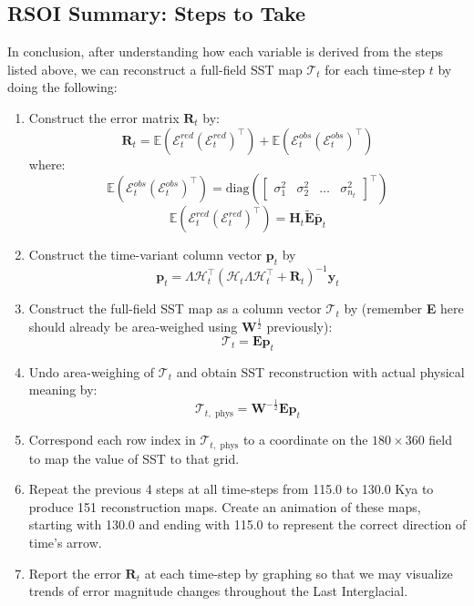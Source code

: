 \documentclass{article}
\begin{document}
\subsection{RSOI Summary: Steps to Take}
In conclusion, after understanding how each variable is derived from the steps listed above, we can reconstruct a full-field SST map $\mathcal{T}_t$ for each time-step $t$ by doing the following:
\begin{enumerate}
    \item Construct the error matrix $\textbf{R}_t$ by:
    $$\textbf{R}_t = \mathbb{E}(\mathcal{E}_t^{red} (\mathcal{E}_t^{red})^\intercal) + \mathbb{E}(\mathcal{E}_t^{obs} (\mathcal{E}_t^{obs})^\intercal)$$
    where:
    $$\mathbb{E}(\mathcal{E}_t^{obs} (\mathcal{E}_t^{obs})^\intercal) = 
    \text{diag}({\begin{bmatrix}
        \sigma^2_1 & \sigma^2_2 & \dots & \sigma^2_{n_t}
    \end{bmatrix}}^\intercal)$$
    $$ \mathbb{E}(\mathcal{E}_t^{red} (\mathcal{E}_t^{red})^\intercal) = 
    \textbf{H}_t \tilde{\textbf{E}} \tilde{\textbf{p}_t}$$

    \item Construct the time-variant column vector $\textbf{p}_t$ by
    $${\textbf{p}_t} = {\Lambda \mathcal{H}_t^\intercal} ({\mathcal{H}_t \Lambda \mathcal{H}_t^\intercal} + {\textbf{R}_t})^{-1} {\textbf{y}_t}$$

    \item Construct the full-field SST map as a column vector $\mathcal{T}_t$ by (remember \textbf{E} here should already be area-weighed using $\textbf{W}^{\frac{1}{2}}$ previously):
    $$\mathcal{T}_t = \textbf{E} \textbf{p}_t$$

    \item Undo area-weighing of $\mathcal{T}_t$ and obtain SST reconstruction with actual physical meaning by:
    $$\mathcal{T}_{t, \text{ phys}} = \textbf{W}^{-\frac{1}{2}} \textbf{E} \textbf{p}_t$$

    \item Correspond each row index in $\mathcal{T}_{t, \text{ phys}}$ to a coordinate on the $180 \times 360$ field to map the value of SST to that grid.

    \item Repeat the previous 4 steps at all time-steps from 115.0 to 130.0 Kya to produce 151 reconstruction maps. Create an animation of these maps, starting with 130.0 and ending with 115.0 to represent the correct direction of time's arrow.
    
    \item Report the error $\textbf{R}_t$ at each time-step by graphing so that we may visualize trends of error magnitude changes throughout the Last Interglacial.
    
\end{enumerate}
\end{document}

